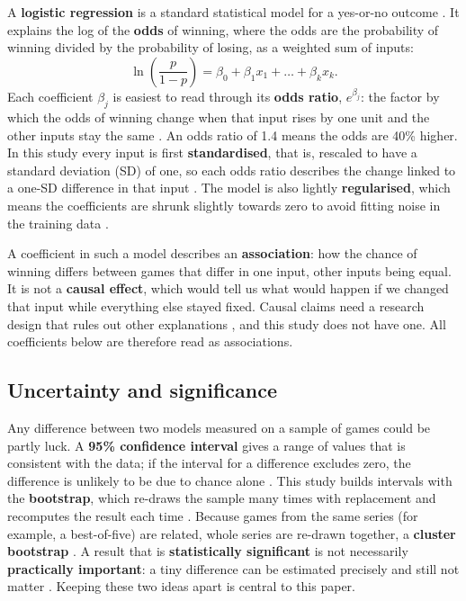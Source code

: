 \documentclass[12pt,a4paper]{article}
\begin{document}
A \textbf{logistic regression} is a standard statistical model for a yes-or-no outcome \citep{hosmer2013}. It explains the log of the \textbf{odds} of winning, where the odds are the probability of winning divided by the probability of losing, as a weighted sum of inputs:
\begin{equation}
\ln\!\left(\frac{p}{1-p}\right) = \beta_0 + \beta_1 x_1 + \dots + \beta_k x_k .
\end{equation}
Each coefficient $\beta_j$ is easiest to read through its \textbf{odds ratio}, $e^{\beta_j}$: the factor by which the odds of winning change when that input rises by one unit and the other inputs stay the same \citep{hosmer2013}. An odds ratio of 1.4 means the odds are 40\% higher. In this study every input is first \textbf{standardised}, that is, rescaled to have a standard deviation (SD) of one, so each odds ratio describes the change linked to a one-SD difference in that input \citep{hastie2009}. The model is also lightly \textbf{regularised}, which means the coefficients are shrunk slightly towards zero to avoid fitting noise in the training data \citep{hastie2009}.

A coefficient in such a model describes an \textbf{association}: how the chance of winning differs between games that differ in one input, other inputs being equal. It is not a \textbf{causal effect}, which would tell us what would happen if we changed that input while everything else stayed fixed. Causal claims need a research design that rules out other explanations \citep{angrist2009}, and this study does not have one. All coefficients below are therefore read as associations.

\subsection{Uncertainty and significance}

Any difference between two models measured on a sample of games could be partly luck. A \textbf{95\% confidence interval} gives a range of values that is consistent with the data; if the interval for a difference excludes zero, the difference is unlikely to be due to chance alone \citep{wasserstein2016}. This study builds intervals with the \textbf{bootstrap}, which re-draws the sample many times with replacement and recomputes the result each time \citep{efron1979}. Because games from the same series (for example, a best-of-five) are related, whole series are re-drawn together, a \textbf{cluster bootstrap} \citep{cameron2008}. A result that is \textbf{statistically significant} is not necessarily \textbf{practically important}: a tiny difference can be estimated precisely and still not matter \citep{wasserstein2016}. Keeping these two ideas apart is central to this paper.
\end{document}
